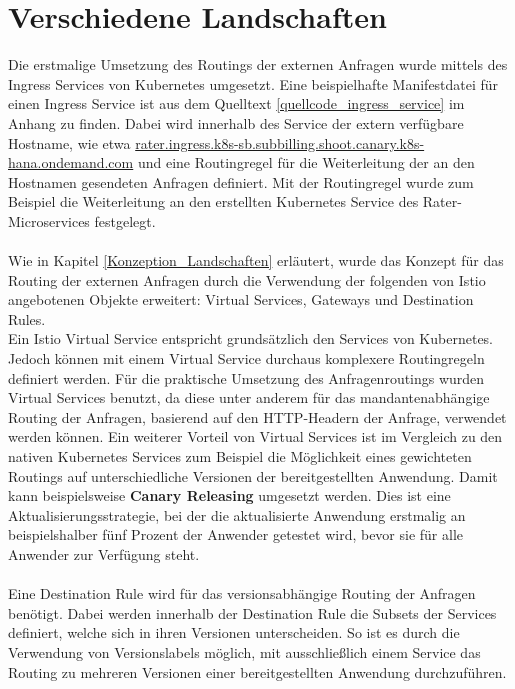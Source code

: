 \section{Verschiedene Landschaften}
\label{Umsetzung_Landschaften}
Die erstmalige Umsetzung des Routings der externen Anfragen wurde mittels des Ingress Services von Kubernetes umgesetzt. Eine beispielhafte Manifestdatei für einen Ingress Service ist aus dem Quelltext \ref{quellcode_ingress_service} im Anhang zu finden. Dabei wird innerhalb des Service der extern verfügbare Hostname, wie etwa \url{rater.ingress.k8s-sb.subbilling.shoot.canary.k8s-hana.ondemand.com} und eine Routingregel für die Weiterleitung der an den Hostnamen gesendeten Anfragen definiert. Mit der Routingregel wurde zum Beispiel die Weiterleitung an den erstellten Kubernetes Service des Rater-Microservices festgelegt.\\
\\
Wie in Kapitel \ref{Konzeption_Landschaften} erläutert, wurde das Konzept für das Routing der externen Anfragen durch die Verwendung der folgenden von Istio angebotenen Objekte erweitert:
Virtual Services, Gateways und Destination Rules. 
\\
Ein Istio Virtual Service entspricht grundsätzlich den Services von Kubernetes. Jedoch können mit einem Virtual Service durchaus komplexere Routingregeln definiert werden. 
\newpage
Für die praktische Umsetzung des Anfragenroutings wurden Virtual Services benutzt, da diese unter anderem für das mandantenabhängige Routing der Anfragen, basierend auf den \ac{HTTP}-Headern der Anfrage, verwendet werden können. 
Ein weiterer Vorteil von Virtual Services ist im Vergleich zu den nativen Kubernetes Services zum Beispiel die Möglichkeit eines gewichteten Routings auf unterschiedliche Versionen der bereitgestellten Anwendung.\autocite[Vgl.][S. 153]{Sharma.2020} Damit kann beispielsweise \textbf{Canary Releasing} umgesetzt werden. Dies ist eine Aktualisierungsstrategie, bei der die aktualisierte Anwendung erstmalig an beispielshalber fünf Prozent der Anwender getestet wird, bevor sie für alle Anwender zur Verfügung steht.\autocite[Vgl.][]{Sato.2014}\\ 
\\
Eine Destination Rule wird für das versionsabhängige Routing der Anfragen benötigt. Dabei werden innerhalb der Destination Rule die Subsets der Services definiert, welche sich in ihren Versionen unterscheiden. So ist es durch die Verwendung von Versionslabels möglich, mit ausschließlich einem Service das Routing zu mehreren Versionen einer bereitgestellten Anwendung durchzuführen.
